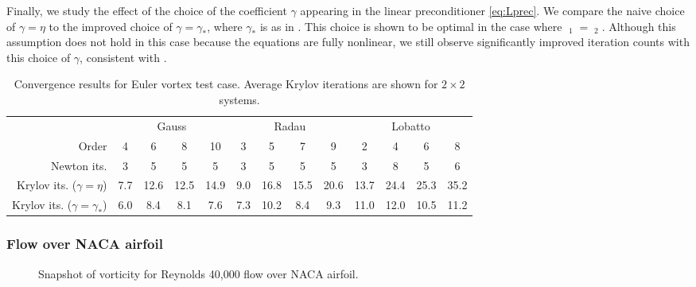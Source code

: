 \documentclass[review]{siamart}
\DeclareMathOperator{\cL}{\widehat{\mathcal{L}}}
\begin{document}
Finally, we study the effect of the choice of the coefficient $\gamma$ appearing in the linear preconditioner \eqref{eq:Lprec}.
We compare the naive choice of $\gamma = \eta$ to the improved choice of $\gamma = \gamma_*$, where $\gamma_*$ is as in .
This choice is shown to be optimal in the case where $\cL_1 = \cL_2$.
Although this assumption does not hold in this case because the equations are fully nonlinear, we still observe significantly improved iteration counts with this choice of $\gamma$, consistent
with .
{
\renewcommand{\tabcolsep}{4pt}
\begin{table}
	\centering
	\caption{Convergence results for Euler vortex test case. Average Krylov iterations are shown for $2 \times 2$ systems.}
	\begin{tabular}{r|cccc|cccc|cccc}
		\toprule
		& \multicolumn{4}{c|}{Gauss} & \multicolumn{4}{c|}{Radau} & \multicolumn{4}{c}{Lobatto}\\
		Order & 4 & 6 & 8 & 10 & 3 & 5 & 7 & 9 & 2 & 4 & 6 & 8 \\
		\midrule
		Newton its. & 3 & 5 & 5 & 5 & 3 & 5 & 5 & 5 & 3 & 8 & 5 & 6 \\
		\midrule
		\makecell[r]{Krylov its.\\($\gamma = \eta$)}
		& 7.7 & 12.6 & 12.5 & 14.9 & 9.0 & 16.8 & 15.5 & 20.6 & 13.7 & 24.4 & 25.3 & 35.2 \\[12pt]
		\makecell[r]{Krylov its.\\($\gamma = \gamma_*$)}
		& 6.0 & 8.4 & 8.1 & 7.6 & 7.3 & 10.2 & 8.4 & 9.3 & 11.0 & 12.0 & 10.5 & 11.2 \\
		\bottomrule
	\end{tabular}
\end{table}
}

\subsubsection{Flow over NACA airfoil}

\begin{figure}
	\centering
	\setlength{\fboxsep}{0pt}
	\caption{Snapshot of vorticity for Reynolds 40{,}000 flow over NACA airfoil.}
\end{figure}
\end{document}
